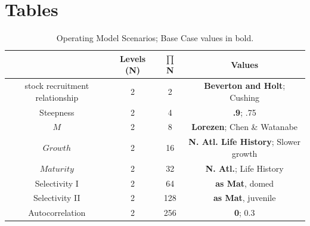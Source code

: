 \documentclass[%
nonumbib,      %
%
]{nrc1}                          %
\begin{document}
\section*{Tables}
\begin{table}
\label{tab:grid}
\caption{Operating Model Scenarios; Base Case values in bold.}  
\begin{center}
\label{tab:datasumm}
\begin{tabular}{|cccc|}
\hline
			& {\tiny Levels (N)} & {\tiny $\prod$ N} & {\tiny Values} \\ %
\hline\hline
{\tiny stock recruitment relationship} 		& {\tiny 2} 	 & {\tiny   2}  & {\tiny  \textbf{Beverton and Holt}; Cushing}     \\%
{\tiny Steepness}	& {\tiny 2} 	 & {\tiny   4}  & {\tiny  \textbf{.9}; .75}                        \\%
{\tiny $M$} 		& {\tiny 2} 	 & {\tiny   8}  & {\tiny  \textbf{Lorezen}; Chen \& Watanabe} 	   \\%
{\tiny $Growth$} 	& {\tiny 2} 	 & {\tiny  16}  & {\tiny  \textbf{N. Atl. Life History}; Slower growth}\\%
{\tiny $Maturity$} 	& {\tiny 2} 	 & {\tiny  32}  & {\tiny  \textbf{N. Atl.}; Life History}      \\%
{\tiny Selectivity I}	& {\tiny 2} 	 & {\tiny  64}  & {\tiny  \textbf{as Mat}, domed}      		   \\%
{\tiny Selectivity II}	& {\tiny 2} 	 & {\tiny 128}  & {\tiny  \textbf{as Mat}, juvenile}   		   \\%
{\tiny Autocorrelation}	& {\tiny 2} 	 & {\tiny 256}  & {\tiny  \textbf{0}; 0.3}                        \\%
\hline
\end{tabular}
\end{center}
\end{table}
\end{document}
